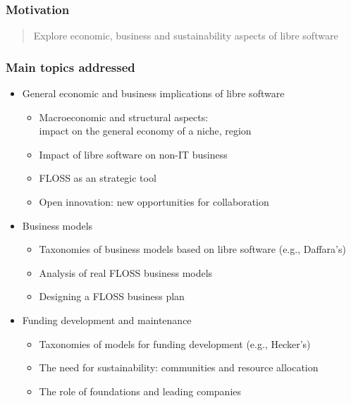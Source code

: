 \begin{frame}
\frametitle{Motivation}

\begin{quote}
\begin{center}
{\LARGE Explore economic, business and sustainability aspects of libre software}
\end{center}
\end{quote}

\end{frame}


\begin{frame}
\frametitle{Main topics addressed}

\begin{itemize}
\item General economic and business implications of libre software
  \begin{itemize}
  \item Macroeconomic and structural aspects: \\
    impact on the general economy of a niche, region
  \item Impact of libre software on non-IT business
  \item FLOSS as an strategic tool
  \item Open innovation: new opportunities for collaboration
  \end{itemize}
\item Business models
  \begin{itemize}
  \item Taxonomies of business models based on libre software (e.g., Daffara's)
  \item Analysis of real FLOSS business models
  \item Designing a FLOSS business plan
  \end{itemize}
\item Funding development and maintenance
  \begin{itemize}
  \item Taxonomies of models for funding development (e.g., Hecker's)
  \item The need for sustainability: communities and resource allocation
  \item The role of foundations and leading companies
  \end{itemize}
\end{itemize}

\end{frame}

